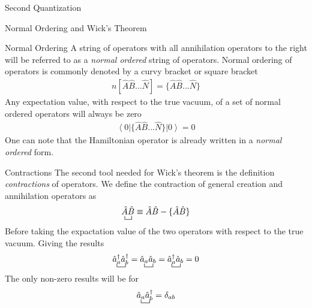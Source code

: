 \documentclass[twoside,english]{uiofysmaster}
\begin{document}
\begin{chapter}{Second Quantization}
\begin{section}{Normal Ordering and Wick's Theorem}
\begin{subsection}{Normal Ordering}
			A string of operators with all annihilation operators to the right will be referred to as a \textit{normal ordered} string of operators. Normal ordering of operators is commonly denoted by a curvy bracket or square bracket
			\begin{align}
				n[ \hat A \hat B ... \hat N ] = \{ \hat A \hat B ... \hat N \}
			\end{align}
			Any expectation value, with respect to the true vacuum, of a set of normal ordered operators will always be zero
			\begin{align}
				\left< 0 \right| \{ \hat A \hat B ... \hat N \} \left| 0 \right> = 0 
				\label{NormalOrdering1}
			\end{align}
			One can note that the Hamiltonian operator is already written in a \textit{normal ordered} form. 
		\end{subsection}

		\begin{subsection}{Contractions}
			The second tool needed for Wick's theorem is the definition \textit{contractions} of operators. We define the contraction of general creation and annihilation operators as
			\begin{align}
				\bcontraction{}{\hat A}{}{\hat B} 
				\hat A \hat B
				\equiv \hat A \hat B - \{ \hat A \hat B \}
			\end{align}
			Before taking the expactation value of the two operators with respect to the true vacuum. 
			Giving the results
			\begin{align}
				\bcontraction{}{\hat a_a^\dagger}{}{\hat a_b^\dagger}
				\hat a_a^\dagger \hat a_b^\dagger 
				= 
				\bcontraction{}{\hat a_a}{}{\hat a_b}
				\hat a_a \hat a_b
				= 
				\bcontraction{}{\hat a_a^\dagger}{}{\hat a_b}
				\hat a_a^\dagger \hat a_b
				= 0 
			\end{align}
			The only non-zero results will be for 
			\begin{align}
				\bcontraction{}{\hat a_a}{}{\hat a_b}
				\hat a_a \hat a_b
				^\dagger = \delta_{ab}
			\end{align}
		\end{subsection}
	

\end{section}
\end{chapter}
\end{document}
